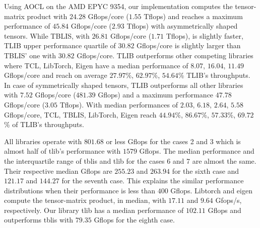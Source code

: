 Using AOCL on the AMD EPYC 9354, our implementation computes the tensor-matrix product with $24.28$ Gflops/core ($1.55$ Tflops) and reaches a maximum performance of $45.84$ Gflops/core ($2.93$ Tflops) with asymmetrically shaped tensors.
While TBLIS, with $26.81$ Gflops/core ($1.71$ Tflops), is slightly faster, TLIB upper performance quartile of $30.82$ Gflops/core is slightly larger than TBLIS' one with $30.82$ Gflops/core. 
TLIB outperforms other competing libraries where TCL, LibTorch, Eigen have a median performance of $8.07$, $16.04$, $11.49$ Gflops/core and reach on average $27.97$\%, $62.97$\%, $54.64$\% TLIB's throughputs.
In case of symmetrically shaped tensors, TLIB outperforms all other libraries with $7.52$ Gflops/core ($481.39$ Gflops) and a maximum performance $47.78$ Gflops/core ($3.05$ Tflops).
With median performances of $2.03$, $6.18$, $2.64$, $5.58$ Gflops/core, TCL, TBLIS, LibTorch, Eigen reach $44.94$\%, $86.67$\%, $57.33$\%, $69.72$\% of TLIB's throughputs.

All libraries operate with $801.68$ or less Gflops for the cases 2 and 3 which is almost half of tlib's performance with $1579$ Gflops.
The median performance and the interquartile range of tblis and tlib for the cases 6 and 7 are almost the same.
Their respective median Gflops are $255.23$ and $263.94$ for the sixth case and $121.17$ and $144.27$ for the seventh case.
This explains the similar performance distributions when their performance is less than $400$ Gflops.
Libtorch and eigen compute the tensor-matrix product, in median, with $17.11$ and $9.64$ Gfops/s, respectively.
Our library tlib has a median performance of $102.11$ Gflops and outperforms tblis with $79.35$ Gflops for the eighth case.


